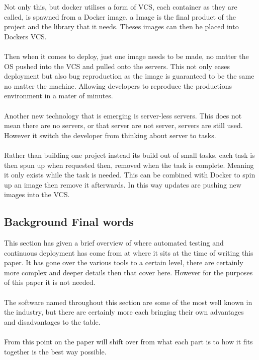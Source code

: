 Not only this, but docker utilises a form of VCS, each container as they are called, is spawned from a Docker image. a Image is the final product of the project and the library that it needs. Theses images can then be placed into Dockers VCS.
\\\\
Then when it comes to deploy, just one image needs to be made, no matter the OS pushed into the VCS and pulled onto the servers. This not only eases deployment but also bug reproduction as the image is guaranteed to be the same no matter the machine. Allowing developers to reproduce the productions environment in a mater of minutes. 
\\\\
Another new technology that is emerging is server-less servers. This does not mean there are no servers, or that server are not server, servers are still used. However it switch the developer from thinking about server to tasks.
\\\\
Rather than building one project instead its build out of small tasks, each task is then spun up when requested then, removed when the task is complete. Meaning it only exists while the task is needed. This can be combined with Docker to spin up an image then remove it afterwards. In this way updates are pushing new images into the VCS.

\subsection{Background Final words}

This section has given a brief overview of where automated testing and continuous deployment has come from at where it sits at the time of writing this paper. It has gone over the various tools to a certain level, there are certainly more complex and deeper details then that cover here. However for the purposes of this paper it is not needed.
\\\\
The software named throughout this section are some of the most well known in the industry, but there are certainly more each bringing their own advantages and disadvantages to the table.
\\\\
From this point on the paper will shift over from what each part is to how it fits together is the best way possible.